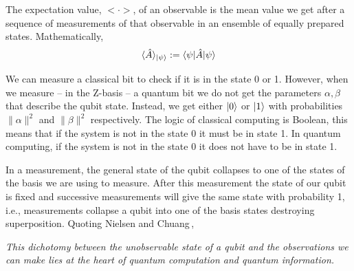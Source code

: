 \begin{definition}
    The expectation value, $<\cdot>$, of an observable is the mean value we get after a sequence of measurements of that observable in an ensemble of equally prepared states.
        Mathematically,
    \begin{equation}
        \langle\hat{A}\rangle_{\ket{\psi}} := \braket{\psi |\hat{A}| \psi}
    \end{equation}
\end{definition}

We can measure a classical bit to check if it is in the state 0 or 1. However, when we measure -- in the Z-basis -- a quantum bit we do not get the parameters $\alpha, \beta$ that describe the qubit state. Instead, we get either $\ket{0}$ or $\ket{1}$ with probabilities $\|\alpha\|^{2}$ and $\|\beta\|^{2}$ respectively. The logic of classical computing is Boolean, this means that if the system is not in the state 0 it must be in state 1. In quantum computing, if the system is not in the state 0 it does not have to be in state 1.   

In a measurement, the general state of the qubit collapses to one of the states of the basis we are using to measure. After this measurement the state of our qubit is fixed and successive measurements will give the same state with probability 1, i.e., measurements collapse a qubit into one of the basis states destroying superposition. Quoting Nielsen and Chuang\,\cite{Nielsen2010QuantumInformation},
\begin{displayquote}
\textit{This dichotomy between the unobservable state of a qubit and the observations we can make lies at the heart of quantum computation and quantum information.}
\end{displayquote}
